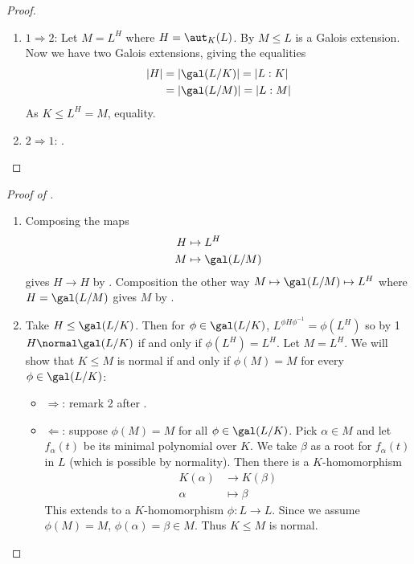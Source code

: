 \documentclass[a4paper]{article}
\begin{document}
\begin{proof}\leavevmode
  \begin{enumerate}
  \item \(1 \Rightarrow 2\): Let \(M = L^H\) where \(H = \aut_K(L)\). By  \(M \leq L\) is a Galois extension. Now we have two Galois extensions, giving the equalities
    \begin{align*}
      |H| &= |\gal(L/K)| = |L:K| \\
          &= |\gal(L/M)| = |L:M|
    \end{align*}
    As \(K \leq L^H = M\), equality.
  \item \(2 \Rightarrow 1\): .
  \end{enumerate}
\end{proof}

\begin{proof}[Proof of ]\leavevmode
  \begin{enumerate}
  \item Composing the maps
    \begin{align*}
      H &\mapsto L^H \\
      M &\mapsto \gal(L/M)
    \end{align*}
    gives \(H \to H\) by . Composition the other way \(M \mapsto \gal(L/M) \mapsto L^H\) where \(H = \gal(L/M)\) gives \(M\) by .
  \item Take \(H \leq \gal(L/K)\). Then for \(\phi \in \gal(L/K)\), \(L^{\phi H \phi^{-1}} = \phi(L^H)\) so by 1 \(H \normal \gal(L/K)\) if and only if \(\phi(L^H) = L^H\). Let \(M = L^H\). We will show that \(K \leq M\) is normal if and only if \(\phi(M) = M\) for every \(\phi \in \gal(L/K)\):
    \begin{itemize}
    \item \(\Rightarrow\): remark 2 after .
    \item \(\Leftarrow\): suppose \(\phi(M) = M\) for all \(\phi \in \gal(L/K)\). Pick \(\alpha \in M\) and let \(f_\alpha(t)\) be its minimal polynomial over \(K\). We take \(\beta\) as a root for \(f_\alpha(t)\) in \(L\) (which is possible by normality). Then there is a \(K\)-homomorphism
      \begin{align*}
        K(\alpha) &\to K(\beta) \\
        \alpha &\mapsto \beta
      \end{align*}
      This extends to a \(K\)-homomorphism \(\phi: L \to L\). Since we assume \(\phi(M) = M\), \(\phi(\alpha) = \beta \in M\). Thus \(K \leq M\) is normal.
    \end{itemize}


\end{enumerate}
\end{proof}
\end{document}
